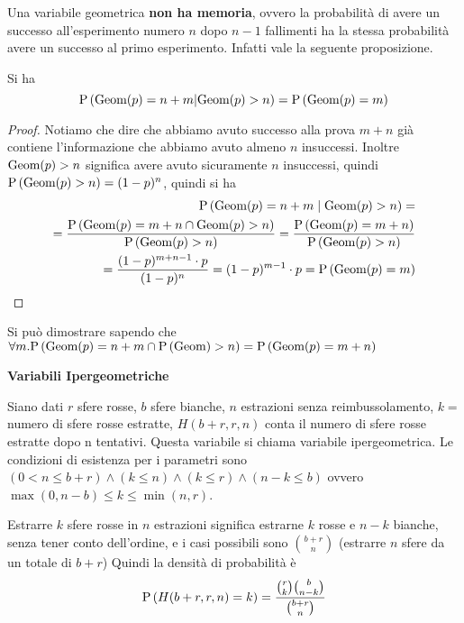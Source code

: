 Una variabile geometrica \textbf{non ha memoria}, ovvero la probabilit\`a di avere un successo 
	 all'esperimento numero $ n $ dopo $n-1$ fallimenti ha la stessa probabilit\`a  avere un successo 
	 al primo esperimento. Infatti vale la seguente proposizione.
\begin{prop}	 
Si ha  
$$	\text{P}\left(\text{Geom}(p) = n+m | \text{Geom}(p) > n\right) = \text{P}\left(\text{Geom}(p) = m\right) $$
\end{prop}
\begin{proof}
    Notiamo che dire che abbiamo avuto successo alla prova $m+n$ gi\`a contiene l'informazione che abbiamo avuto almeno $n$ insuccessi. Inoltre $\text{Geom}(p) > n$ significa avere avuto sicuramente $n$ insuccessi, quindi
    $\text{P}\left(\text{Geom}(p) > n\right)=(1-p)^n$, quindi si ha
    \begin{equation*}
        \begin{aligned}
            \text{P}\left(\text{Geom}(p) = n+m \mid \text{Geom}(p) > n\right) =  \\
            = \dfrac{\text{P}\left(\text{Geom}(p) = m + n \cap \text{Geom}(p) > n\right)}{\text{P}\left(\text{Geom}(p) > n\right)} = \dfrac{\text{P}\left(\text{Geom}(p) = m+n\right)}{\text{P}\left(\text{Geom}(p) > n\right)}\\
            = \dfrac{(1-p)^{m+n-1} \cdot p}{(1-p)^n} = {(1-p)^{m-1} \cdot p}=\text{P}\left(\text{Geom}(p) = m\right) \\
        \end{aligned}
    \end{equation*}
\end{proof}

    Si può dimostrare sapendo che $ \forall m . \text{P}\left(\text{Geom}(p) = n+m \cap \text{P}\left(\text{Geom}\right) > n\right) = \text{P}\left(\text{Geom}(p) = m+n\right) $
    

\begin{defn}
    \textbf{Variabili Ipergeometriche}
    
	Siano dati $ r $ sfere rosse, $ b $ sfere bianche, $ n $ estrazioni senza reimbussolamento, $ k = $ numero di sfere rosse estratte, $ H(b+r, r, n) $ conta il numero di sfere rosse estratte dopo n tentativi. Questa variabile si chiama variabile ipergeometrica. Le condizioni di esistenza per i parametri sono $ (0 < n \leq b + r) \land (k \leq n)  \land (k \leq r) \land (n-k \leq b) $ ovvero $\max(0,n-b)\le k \le \min(n,r)$.

    Estrarre $k$ sfere rosse in $n$ estrazioni significa estrarne $k$ rosse e $n-k$ bianche, senza tener
	 conto dell'ordine, e i casi possibili sono $\binom{b+r}{n}$ (estrarre $n$ sfere da un totale di $b+r$)
	 Quindi la densit\`a  di probabilit\`a \`e
    \begin{equation*}
    \text{P}\left(H(b+r, r, n) = k\right) = \dfrac{\binom{r}{k} \binom{b}{n-k}}{\binom{b+r}{n}}
    \end{equation*}
\end{defn}

